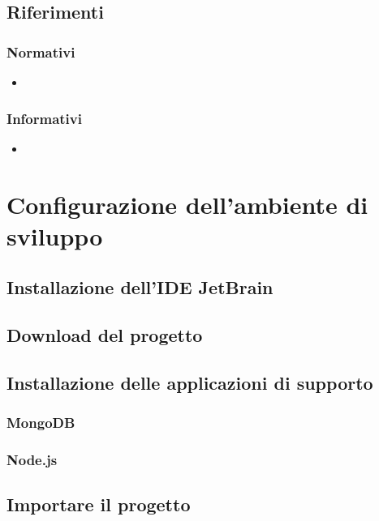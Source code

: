 \documentclass[12pt,a4paper]{article}
\begin{document}
	\subsection{Riferimenti}
	
	\subsubsection{Normativi}
	\begin{itemize}
		\item \TODO{}
		
	\end{itemize}
	
	\subsubsection{Informativi}
	\begin{itemize}
		\item \TODO{}
	\end{itemize}
	
	\newpage
	\section{Configurazione dell'ambiente di sviluppo}
	\subsection{Installazione dell'IDE JetBrain}
	\subsection{Download del progetto}
	\subsection{Installazione delle applicazioni di supporto}
	\subsubsection{MongoDB}
	\subsubsection{Node.js}
	\subsection{Importare il progetto}
\end{document}
